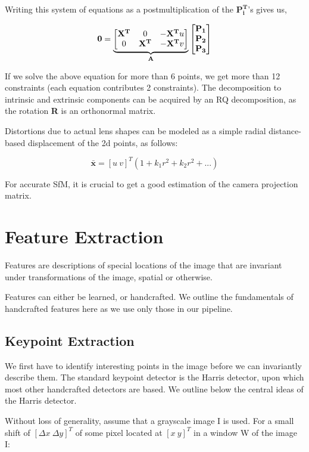 Writing this system of equations as a postmultiplication of the $\mathbf{P_i^T}$'s gives us,

\[\mathbf{0} = \underbrace{\begin{bmatrix}
\mathbf{X^T} & 0 & -\mathbf{X^T}u\\
0 & \mathbf{X^T} & -\mathbf{X^T}v\\
\end{bmatrix}}_{\text{\textbf{A}}} \begin{bmatrix}
\mathbf{P_1}\\
\mathbf{P_2}\\
\mathbf{P_3}\end{bmatrix}\]

If we solve the above equation for more than 6 points, we get more than 12 constraints (each equation contributes 2 constraints). The decomposition to intrinsic and extrinsic components can be acquired by an RQ decomposition, as the rotation \textbf{R} is an orthonormal matrix.

Distortions due to actual lens shapes can be modeled as a simple radial distance-based displacement of the 2d points, as follows:

\[\bar{\mathbf{x}} = [u\ v]^T (1 + k_1r^2 + k_2r^2 + ...)\]

For accurate SfM, it is crucial to get a good estimation of the camera projection matrix. 

\section{Feature Extraction}
Features are descriptions of special locations of the image that are invariant under transformations of the image, spatial or otherwise. 

Features can either be learned, or handcrafted. We outline the fundamentals of handcrafted features here as we use only those in our pipeline.
\subsection{Keypoint Extraction}
We first have to identify interesting points in the image before we can invariantly describe them. The standard keypoint detector is the Harris detector, upon which most other handcrafted detectors are based. We outline below the central ideas of the Harris detector. 

Without loss of generality, assume that a grayscale image I is used. For a small shift of $[\Delta x \ \Delta y]^T$ of some pixel located at $[x \ y]^T$ in a window W of the image I:

